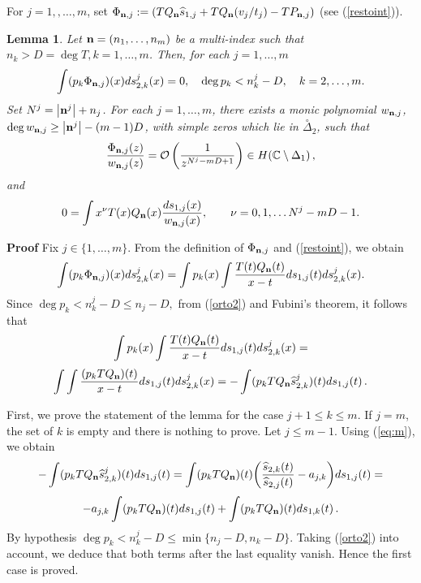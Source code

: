 \documentclass[10pt,a4paper]{article}
\newtheorem{lemma}[theorem]{Lemma}
\theoremstyle{definition}
\theoremstyle{remark}
\numberwithin{equation}{section}
\begin{document}
For $j=1,,\ldots,m$, set $\Phi_{{\bf n},j}:=(T Q_{{\bf n}} \widehat{s}_{1,j} + TQ_{{\bf n}}(v_{j}/t_{j})  -T P_{{\bf n},j}) $ (see (\ref{restoint})).
\begin{lemma} \label{lem:b}
Let ${{\bf n}} = (n_1,\ldots,n_m)$ be a multi-index such that $n_k > D = \deg T, k=1,\ldots,m$. Then, for each $j=1,
\ldots, m$
\begin{equation}\label{eq:j}
\int  (p_k  \Phi_{{{\bf n}},j} )(x) ds_{2,k}^j(x)  = 0,  \quad \deg p_k < n_{k}^{j}-D, \quad k=2,\ldots,m.
\end{equation}
Set $N^{j}=\left|{\bf n}^{j}\right|+n_{j}$. For each $j=1,\ldots,m$, there exists a monic polynomial $w_{{\bf n},j}$, $\deg w_{{\bf n},j}\geq  \left|{\bf n}^{j}\right|-(m-1)D$, with simple zeros which lie in  $\stackrel{\circ}{\Delta}_{2}$, such that
\begin{equation}\label{eq:p:1}
\frac{\Phi_{{{\bf n}},j}(z)}{w_{{\bf n},j}(z)}
=\mathcal{O}\left(\frac{1}{z^{N^{j}-mD+1}}\right) \in H(\mathbb{C}\setminus \Delta_1)\,,
\end{equation}
and
\begin{equation}\label{ROIK}
0=\int x^{\nu}T(x)Q_{{\bf n}}(x)\frac{ds_{1,j}(x)}{w_{{\bf n},j}(x)}, \qquad \nu=0,1,\ldots N^{j}-mD-1.
\end{equation}
\end{lemma}

{\bf Proof} Fix $j \in \{1,\ldots,m\}$. From the definition of
$\Phi_{{\bf n},j} $ and (\ref{restoint}),  we obtain
\[
\int  (p_k  \Phi_{{{\bf n}},j} )(x) ds_{2,k}^j(x)=\int
p_k(x) \int  \frac{T(t)Q_{{\bf n}}(t)}{x-t} d s_{1,j}(t) ds_{2,k}^j(x).
\]
Since $\deg p_k < n_k^j -D\leq n_j-D,$ from (\ref{orto2}) and
Fubini's theorem, it follows that
\[
\int  p_k(x) \int  \frac{T(t)Q_{{\bf n}}(t)}{x-t} d
s_{1,j}(t) ds_{2,k}^j(x)=
\]
\begin{equation}
\label{fundemo}\int  \int
\frac{(p_kTQ_{{\bf n}})(t)}{x-t} d s_{1,j}(t)ds_{2,k}^j(x)= -\int (p_kTQ_{{\bf n}}
\widehat{s}_{2,k}^j)(t) d s_{1,j}(t)\,.
\end{equation}

First, we prove the statement of the lemma for the case $j+1 \leq
k \leq m$. If $j = m$, the set of $k$ is empty and there is nothing to prove. Let $j \leq m-1$.
Using (\ref{eq:m}), we obtain
\[
- \int  (p_k TQ_{{\bf n}} \widehat{s}_{2,k}^j)(t)d
s_{1,j}(t) =
  \int (p_k TQ_{{\bf n}})(t)
\displaystyle{\left(\frac{\widehat{s}_{2,k}(t)}{\widehat{s}_{2,j}(t)}
- a_{j,k} \right)} d s_{1,j}(t) =
\]
\[-a_{j,k} \int  (p_kTQ_{{\bf n}})(t) d s_{1,j}(t)+ \int
 (p_kTQ_{{\bf n}})(t) d s_{1,k}(t)\,.
\]
By hypothesis
$\deg p_k < n_k^j-D \leq \min \{n_j-D,n_k-D\}$. Taking (\ref{orto2}) into account, we deduce that both terms after the last equality vanish. Hence the
first case is proved.
\end{document}
